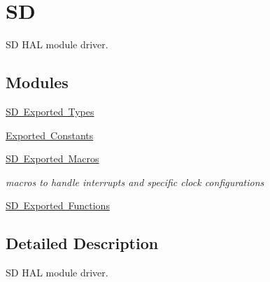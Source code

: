 \hypertarget{group___s_d}{}\section{SD}
\label{group___s_d}


SD H\+AL module driver.  


\subsection*{Modules}
\begin{DoxyCompactItemize}
\item 
\mbox{\hyperlink{group___s_d___exported___types}{S\+D Exported Types}}
\item 
\mbox{\hyperlink{group___s_d___exported___constants}{Exported Constants}}
\item 
\mbox{\hyperlink{group___s_d___exported__macros}{S\+D Exported Macros}}
\begin{DoxyCompactList}\small\item\em macros to handle interrupts and specific clock configurations \end{DoxyCompactList}\item 
\mbox{\hyperlink{group___s_d___exported___functions}{S\+D Exported Functions}}
\end{DoxyCompactItemize}


\subsection{Detailed Description}
SD H\+AL module driver. 


